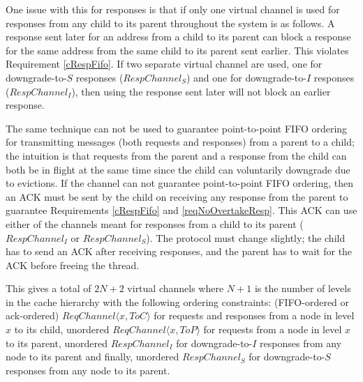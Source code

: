 One issue with this for responses is that if only one virtual channel is used
for responses from any child to its parent throughout the system is as follows.
A response sent later for an address from a child to its parent can block a
response for the same address from the same child to its parent sent earlier.
This violates Requirement \ref{cRespFifo}. If two separate virtual channel are
used, one for downgrade-to-$S$ responses ($RespChannel_S$) and one for
downgrade-to-$I$ responses ($RespChannel_I$), then using the response sent later
will not block an earlier response.

The same technique can not be used to guarantee point-to-point FIFO ordering
for transmitting messages (both requests and responses) from a parent to a
child; the intuition is that requests from the parent and a response from the
child can both be in flight at the same time since the child can voluntarily
downgrade due to evictions.  If the channel can not guarantee point-to-point
FIFO ordering, then an ACK must be sent by the child on receiving any response
from the parent to guarantee Requirements \ref{cRespFifo} and
\ref{reqNoOvertakeResp}. This ACK can use either of the channels meant for
responses from a child to its parent ($RespChannel_I$ or $RespChannel_S$).  The
protocol must change slightly; the child has to send an ACK after receiving
responses, and the parent has to wait for the ACK before freeing the thread.

This gives a total of $2N + 2$ virtual channels where $N + 1$ is the number of
levels in the cache hierarchy with the following ordering constraints:
(FIFO-ordered or ack-ordered) $ReqChannel\langle x, ToC \rangle$ for requests and
responses from a node in level $x$ to its child, unordered $ReqChannel\langle x,
ToP \rangle$ for requests from a node in level $x$ to its parent, unordered
$RespChannel_I$ for downgrade-to-$I$ responses from any node to its parent and
finally, unordered $RespChannel_S$ for downgrade-to-$S$ responses from any node
to its parent.

